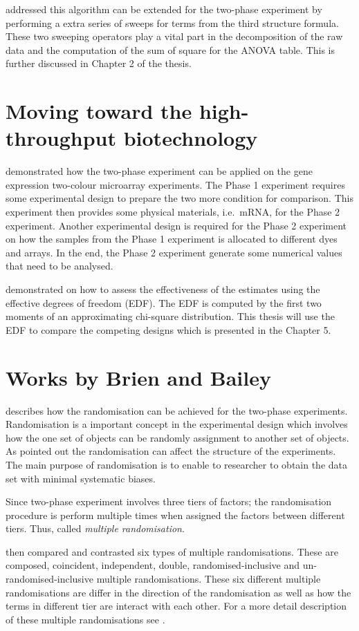 \documentclass[11pt,a4paper]{article}
\begin{document}
\cite{Brien1999} addressed this algorithm can be extended for the two-phase experiment by performing a extra series of sweeps for terms from the third structure formula. These two sweeping operators play a vital part in the decomposition of the raw data and the computation of the sum of square for the ANOVA table. This is further discussed in Chapter 2 of the thesis.

\section{Moving toward the high-throughput biotechnology}
\cite{Jarrett2008} demonstrated how the two-phase experiment can be applied on the gene expression two-colour microarray experiments. The Phase 1 experiment requires some experimental design to prepare the two more condition for comparison. This experiment then provides some physical materials, i.e.\ mRNA, for the Phase 2 experiment. Another experimental design is required for the Phase 2 experiment on how the samples from the Phase 1 experiment is allocated to different dyes and arrays. In the end, the Phase 2 experiment generate some numerical values that need to be analysed. 

\cite{Jarrett2008} demonstrated on how to assess the effectiveness of the estimates using the effective degrees of freedom (EDF). The EDF is computed by the first two moments of an approximating chi-square distribution. This thesis will use the EDF to compare the competing designs which is presented in the Chapter 5.


\section{Works by Brien and Bailey} 
\cite{Brien2006b} describes how the randomisation can be achieved for the two-phase experiments. Randomisation is a important concept in the experimental design which involves how the one set of objects can be randomly assignment to another set of objects. As \cite{Brien1983} pointed out the randomisation can affect the structure of the experiments. The main purpose of randomisation is to enable to researcher to obtain the data set with minimal systematic biases. 

Since two-phase experiment involves three tiers of factors; the randomisation procedure is perform multiple times when assigned the factors between different tiers. Thus, \cite{Brien2006b} called \emph{multiple randomisation}. 

\cite{Brien2006b} then compared and contrasted six types of multiple randomisations. These are composed, coincident, independent, double, randomised-inclusive and un-randomised-inclusive multiple randomisations. These six different multiple randomisations are differ in the direction of the randomisation as well as how the terms in different tier are interact with each other. For a more detail description of these multiple randomisations see \cite{Brien2006b}.  
\end{document}
